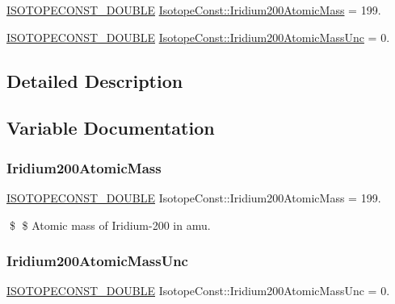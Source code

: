 \begin{DoxyCompactItemize}
\item 
\mbox{\hyperlink{group___isotope_const-_macros_ga8f45a7272ce02c0b4c65c44636ed719a}{I\+S\+O\+T\+O\+P\+E\+C\+O\+N\+S\+T\+\_\+\+D\+O\+U\+B\+LE}} \mbox{\hyperlink{group___isotope_const-_iridium-_ir200_ga7a7f94aba84f659a3eb223f614a5b4de}{Isotope\+Const\+::\+Iridium200\+Atomic\+Mass}} = 199.
\item 
\mbox{\hyperlink{group___isotope_const-_macros_ga8f45a7272ce02c0b4c65c44636ed719a}{I\+S\+O\+T\+O\+P\+E\+C\+O\+N\+S\+T\+\_\+\+D\+O\+U\+B\+LE}} \mbox{\hyperlink{group___isotope_const-_iridium-_ir200_ga083aa5051d0ba93edec4243451c97259}{Isotope\+Const\+::\+Iridium200\+Atomic\+Mass\+Unc}} = 0.
\end{DoxyCompactItemize}


\subsection{Detailed Description}


\subsection{Variable Documentation}
\mbox{\label{group___isotope_const-_iridium-_ir200_ga7a7f94aba84f659a3eb223f614a5b4de}} 
\subsubsection{\texorpdfstring{Iridium200\+Atomic\+Mass}{Iridium200AtomicMass}}
{\footnotesize\ttfamily \mbox{\hyperlink{group___isotope_const-_macros_ga8f45a7272ce02c0b4c65c44636ed719a}{I\+S\+O\+T\+O\+P\+E\+C\+O\+N\+S\+T\+\_\+\+D\+O\+U\+B\+LE}} Isotope\+Const\+::\+Iridium200\+Atomic\+Mass = 199.}

\$ \$ Atomic mass of Iridium-\/200 in amu. \mbox{\label{group___isotope_const-_iridium-_ir200_ga083aa5051d0ba93edec4243451c97259}} 
\subsubsection{\texorpdfstring{Iridium200\+Atomic\+Mass\+Unc}{Iridium200AtomicMassUnc}}
{\footnotesize\ttfamily \mbox{\hyperlink{group___isotope_const-_macros_ga8f45a7272ce02c0b4c65c44636ed719a}{I\+S\+O\+T\+O\+P\+E\+C\+O\+N\+S\+T\+\_\+\+D\+O\+U\+B\+LE}} Isotope\+Const\+::\+Iridium200\+Atomic\+Mass\+Unc = 0.}

